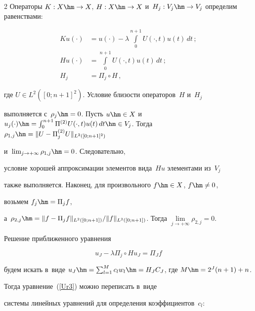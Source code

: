 \begin{multicols}{2}
 Операторы $K:X\hm\to X$, $H:X\hm\to X$ и~$H_j : V_j\hm\to V_j$ определим равенствами:


\begin{align*}


Ku(\cdot)&=u(\cdot)-\lambda\int\limits_0^{n+1} U(\cdot,t)u(t)\,dt\,;\\


Hu(\cdot)&=\int\limits_0^{n+1} U(\cdot,t)u(t)\,dt\,;\\


H_j&=\Pi_j\circ H\,,


\end{align*}


где $U\in {L}^2([0;n+1]^2)$. Условие близости операторов~$H$ и~$H_j$ 


выполняется с~$\rho_j\hm=0$. Пусть  $u\hm\in X$ и~$u_j(\cdot)\hm=\int\nolimits_0^{n+1} 


\Pi^{(2)}U(\cdot,t)u(t)\,dt\hm\in V_j$. То\-гда $\rho_{1,j}\hm=


\|U-\Pi_j^{(2)}U\|_{{L}^2([0;n+1]^2)}$ 


и~$\lim\nolimits_{j\to +\infty} \rho_{1,j}\hm=0$. Следовательно, 


условие хорошей аппроксимации элементов вида~$Hu$ элементами из~$V_j$ 


также выполняется. Наконец, для произвольного $f\hm\in X$, $f\hm\ne 0$, 


возьмем $f_j\hm=\Pi_j f$, 


а~$\rho_{2,j}\hm={\|f-\Pi_j f\|_{{L}^2([0;n+1])}}/{\|f\|_{{L}^2([0;n+1])}}$. Тогда $\lim\limits_{j\to +\infty} \rho_{2,j}=0$. 





Решение приближенного уравнения


\begin{equation}


\label{Ur3}


u_J-\lambda\Pi_j\circ H u_J=\Pi_J f


\end{equation}


будем искать в~виде $u_J\hm=\sum\nolimits_{l=1}^{M} c_l w_l 


\hm= {H}_J{C}_J $, где $M\hm=2^{J}(n+1)+n$. 


Тогда уравнение~(\ref{Ur3}) можно переписать в~виде


системы линейных уравнений для определения коэффициентов~$c_l$:


\begin{multline*}



\end{multline*}
\end{multicols}
